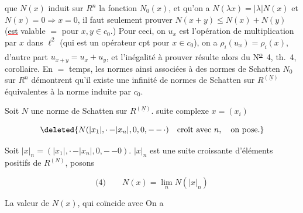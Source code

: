 
\reversemarginpar
{}
\normalmarginpar

que $N(x)$ induit sur $R^n$ la fonction $N_0(x)$, et qu'on a $N(\lambda x)=|\lambda|N(x)$ et $N(x)=0\Rightarrow x=0$, il faut seulement prouver $N(x+y)\leq N(x)+N(y)$ (\textcolor{red}{\uline{\textcolor{black}{est}}} valable $=$ pour $x,y\in c_0$.) Pour ceci, on  $u_x$ est l'opération de multiplication par $x$ dans $\ell^2$ (qui est un opérateur cpt pour $x\in c_0$), on a  $\rho_i(u_x)=\rho_i(x)$, d'autre part  $u_{x+y}=u_x+u_y$, et l'inégalité à prouver résulte alors du N\textsuperscript{\uline{o}}~4, th.~4, corollaire. En $=$ temps, les normes  ainsi associées à des normes  de Schatten $N_0$ sur $R^n$  démontrent qu'il existe une infinité  de normes de Schatten sur $R^{(\underline N)}$ équivalentes à la norme induite par $c_0$.

Soit $N$  une norme de Schatten sur  $R^{(\underline N)}$.  suite  complexe $x=(x_i)$   

\[
\deleted{N(|x_1|,\mathord{\cdot}\,\mathord{-}|x_n|,0,0,\mathord{-}\,\mathord{-}\,\mathord{\cdot})\quad\text{croît avec }n,\quad\text{on pose.}}
\]

Soit $|x|_n=(|x_1|,\mathord{\cdot}\,\mathord{-}|x_n|,0,\mathord{-}\,\mathord{-}0)$.   $|x|_n$ est une suite croissante d'éléments positifs de $R^{(N)}$, posons

\[
\text{(4)}\qquad N(x)=\lim_n N(|x|_n)
\]

 La valeur  de $N(x)$, qui coïncide avec   On a


